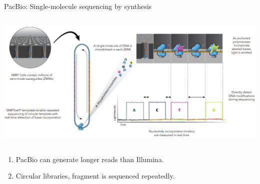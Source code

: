 \documentclass[10pt]{beamer}
\begin{document}
\begin{frame}{PacBio: Single-molecule sequencing by synthesis}
	\begin{columns}[T]
		\column{\dimexpr\paperwidth-10pt}
		\includegraphics[width=\textwidth]{./figures/pacbio.png}
	\end{columns}
		\begin{enumerate}
			\item PacBio can generate longer reads than Illumina.
			\item Circular libraries, fragment is sequenced repeatedly.
		\end{enumerate}
\end{frame}
\end{document}
